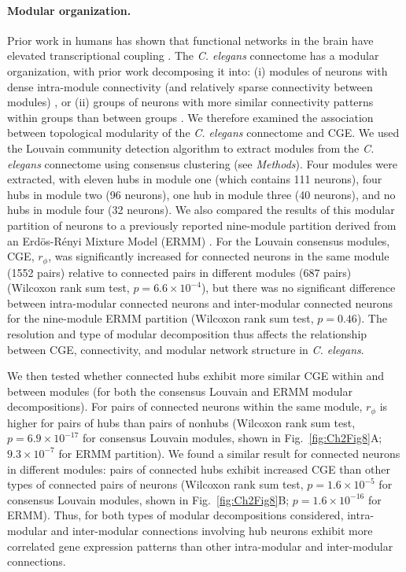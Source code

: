 {\paragraph{Modular organization.}

Prior work in humans has shown that functional networks in the brain have elevated transcriptional coupling \citep{Richiardi2015}.
The \emph{C. elegans} connectome has a modular organization, with prior work decomposing it into:
(i) modules of neurons with dense intra-module connectivity (and relatively sparse connectivity between modules) \citep{Kim2014a, Pan2010, Bassett2010}, or
(ii) groups of neurons with more similar connectivity patterns within groups than between groups \citep{Achacoso1992, Pavlovic2014}.
We therefore examined the association between topological modularity of the \emph{C. elegans} connectome and CGE.
We used the Louvain community detection algorithm \citep{Blondel2008} to extract modules from the \emph{C. elegans} connectome using consensus clustering (see \textit{Methods}).
Four modules were extracted, with eleven hubs in module one (which contains 111 neurons), four hubs in module two (96 neurons), one hub in module three (40 neurons), and no hubs in module four (32 neurons).
We also compared the results of this modular partition of neurons to a previously reported nine-module partition derived from an Erd\"os-R\'enyi Mixture Model (ERMM) \citep{Pavlovic2014}.
For the Louvain consensus modules, CGE, $r_\phi$, was significantly increased for connected neurons in the same module (1552 pairs) relative to connected pairs in different modules (687 pairs) (Wilcoxon rank sum test, $p = 6.6 \times 10^{-4}$), but there was no significant difference between intra-modular connected neurons and inter-modular connected neurons for the nine-module ERMM partition (Wilcoxon rank sum test, $p = 0.46$).
The resolution and type of modular decomposition thus affects the relationship between CGE, connectivity, and modular network structure in \emph{C. elegans}.

We then tested whether connected hubs exhibit more similar CGE within and between modules (for both the consensus Louvain and ERMM modular decompositions).
For pairs of connected neurons within the same module, $r_\phi$ is higher for pairs of hubs than pairs of nonhubs (Wilcoxon rank sum test, $p = 6.9\times 10^{-17}$ for consensus Louvain modules, shown in Fig.~\ref{fig:Ch2Fig8}A; $9.3 \times 10^{-7}$ for ERMM partition).
We found a similar result for connected neurons in different modules: pairs of connected hubs exhibit increased CGE than other types of connected pairs of neurons (Wilcoxon rank sum test, $p = 1.6 \times 10^{-5}$ for consensus Louvain modules, shown in Fig.~\ref{fig:Ch2Fig8}B; $p = 1.6 \times 10^{-16}$ for ERMM).
Thus, for both types of modular decompositions considered, intra-modular and inter-modular connections involving hub neurons exhibit more correlated gene expression patterns than other intra-modular and inter-modular connections.

}

